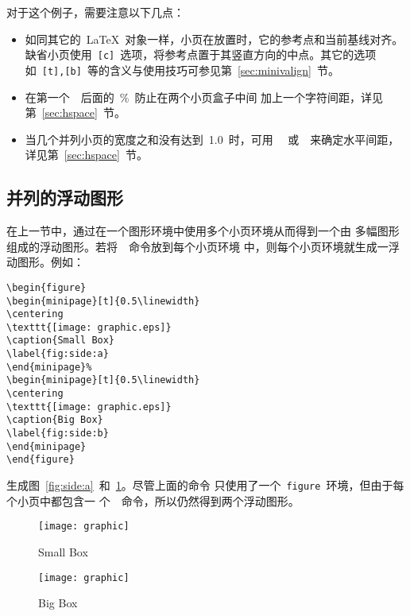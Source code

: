 对于这个例子，需要注意以下几点：
\begin{itemize}
	\item 如同其它的~\LaTeX{}~对象一样，小页在放置时，它的参考点和当前基线对齐。
	缺省小页使用~\texttt{[c]}~选项，将参考点置于其竖直方向的中点。其它的选项
	如~\texttt{[t],[b]}~等的含义与使用技巧可参见第~\ref{sec:minivalign}~节。
	\item 在第一个~~后面的~\%~防止在两个小页盒子中间
	加上一个字符间距，详见第~\ref{sec:hspace}~节。
	\item 当几个并列小页的宽度之和没有达到~1.0~时，可用
	~~或~~来确定水平间距，详见第~\ref{sec:hspace}~节。
\end{itemize}

\subsection{并列的浮动图形}\label{ssec:sidefigure}

在上一节中，通过在一个图形环境中使用多个小页环境从而得到一个由
多幅图形组成的浮动图形。若将~~命令放到每个小页环境
中，则每个小页环境就生成一浮动图形。例如：
\begin{Verbatim}[xleftmargin=1cm]
\begin{figure} 
\begin{minipage}[t]{0.5\linewidth} 
\centering 
\texttt{[image: graphic.eps]} 
\caption{Small Box} 
\label{fig:side:a} 
\end{minipage}% 
\begin{minipage}[t]{0.5\linewidth} 
\centering 
\texttt{[image: graphic.eps]} 
\caption{Big Box} 
\label{fig:side:b} 
\end{minipage} 
\end{figure}
\end{Verbatim}
生成图~\ref{fig:side:a}~和~\ref{fig:side:b}。尽管上面的命令
只使用了一个~\texttt{figure}~环境，但由于每个小页中都包含一
个~~命令，所以仍然得到两个浮动图形。

\begin{figure} 
	\begin{minipage}[t]{0.5\linewidth} 
		\centering 
		\texttt{[image: graphic]}
		\caption{Small Box} 
		\label{fig:side:a} 
	\end{minipage}%
	\begin{minipage}[t]{0.5\linewidth} 
		\centering 
		\texttt{[image: graphic]}
		\caption{Big Box} 
		\label{fig:side:b} 
	\end{minipage} 
\end{figure}

